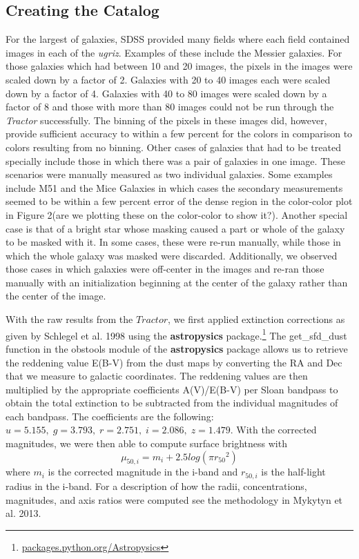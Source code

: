 \documentclass[12pt,preprint,pdftex]{aastex}
\begin{document}
\subsection{Creating the Catalog}

For the largest of galaxies, SDSS provided many fields where each field contained images in each of the \textit{ugriz}. Examples of these include the Messier galaxies. For those galaxies which had between 10 and 20 images, the pixels in the images were scaled down by a factor of 2. Galaxies with 20 to 40 images each were scaled down by a factor of 4. Galaxies with 40 to 80 images were scaled down by a factor of 8 and those with more than 80 images could not be run through the \textit{Tractor} successfully. The binning of the pixels in these images did, however, provide sufficient accuracy to within a few percent for the colors in comparison to colors resulting from no binning. Other cases of galaxies that had to be treated specially include those in which there was a pair of galaxies in one image. These scenarios were manually measured as two individual galaxies. Some examples include M51 and the Mice Galaxies in which cases the secondary measurements seemed to be within a few percent error of the dense region in the color-color plot in Figure 2(are we plotting these on the color-color to show it?). Another special case is that of a bright star whose masking caused a part or whole of the galaxy to be masked with it. In some cases, these were re-run manually, while those in which the whole galaxy was masked were discarded.  Additionally, we observed those cases in which galaxies were off-center in the images and re-ran those manually with an initialization beginning at the center of the galaxy rather than the center of the image. 

With the raw results from the $Tractor$, we first applied extinction corrections as given by Schlegel et al. 1998 using the \textbf{astropysics} package.\footnote{\url{packages.python.org/Astropysics}} The get\_sfd\_dust function in the obstools module of the {\bf astropysics} package allows us to retrieve the reddening value E(B-V) from the dust maps by converting the RA and Dec that we measure to galactic coordinates. The reddening values are then multiplied by the appropriate coefficients A(V)/E(B-V) per Sloan bandpass to obtain the total extinction to be subtracted from the individual magnitudes of each bandpass. The coefficients are the following: $u=5.155,\;g=3.793,\; r=2.751,\; i=2.086,\; z=1.479$. With the corrected magnitudes, we were then able to compute surface brightness with \begin{equation} \mu_{50,i}=m_i+2.5log(\pi{r_{50}}^2) \end{equation} where $m_i$ is the corrected magnitude in the i-band and $r_{50,i}$ is the half-light radius in the i-band. For a description of how the radii, concentrations, magnitudes, and axis ratios were computed see the methodology in Mykytyn et al. 2013. 
\end{document}
